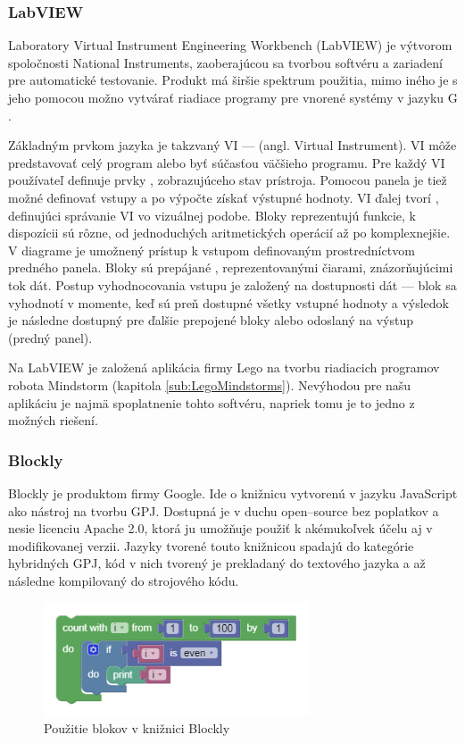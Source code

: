 \subsubsection{LabVIEW}
Laboratory Virtual Instrument Engineering Workbench (LabVIEW) je výtvorom spoločnosti National Instruments, zaoberajúcou sa tvorbou softvéru a zariadení pre automatické testovanie. Produkt má širšie spektrum použitia, mimo iného je s jeho pomocou možno vytvárať riadiace programy pre vnorené systémy v jazyku G \cite{LabVIEW}.

Základným prvkom jazyka je takzvaný VI ---  (angl. Virtual Instrument). VI môže predstavovať celý program alebo byť súčasťou väčšieho programu. Pre každý VI používateľ definuje prvky , zobrazujúceho stav prístroja. Pomocou panela je tiež možné definovať vstupy a po výpočte získať výstupné hodnoty. VI ďalej tvorí , definujúci správanie VI vo vizuálnej podobe. Bloky reprezentujú funkcie, k dispozícii sú rôzne, od jednoduchých aritmetických operácií až po komplexnejšie. V diagrame je umožnený prístup k vstupom definovaným prostredníctvom predného panela. Bloky sú prepájané , reprezentovanými čiarami, znázorňujúcimi tok dát. Postup vyhodnocovania vstupu je založený na dostupnosti dát --- blok sa vyhodnotí v momente, keď sú preň dostupné všetky vstupné hodnoty a výsledok je následne dostupný pre ďalšie prepojené bloky alebo odoslaný na výstup (predný panel).

Na LabVIEW je založená aplikácia firmy Lego na tvorbu riadiacich programov robota Mindstorm (kapitola \ref{sub:LegoMindstorms}). Nevýhodou pre našu aplikáciu je najmä spoplatnenie tohto softvéru, napriek tomu je to jedno z možných riešení.

\subsubsection{Blockly}
Blockly je produktom firmy Google. Ide o knižnicu vytvorenú v jazyku JavaScript ako nástroj na tvorbu GPJ. Dostupná je v duchu open--source bez poplatkov a nesie licenciu Apache 2.0, ktorá ju umožňuje použiť k akémukoľvek účelu aj v modifikovanej verzii. Jazyky tvorené touto knižnicou spadajú do kategórie hybridných GPJ, kód v nich tvorený je prekladaný do textového jazyka a až následne kompilovaný do strojového kódu.

\begin{figure}
\centerline{\includegraphics[width=0.7\textwidth]{images/blocky-example}}
\caption[Použitie blokov v knižnici Blockly]{Použitie blokov v knižnici Blockly}
\label{obr:blockly-example}
\end{figure}

